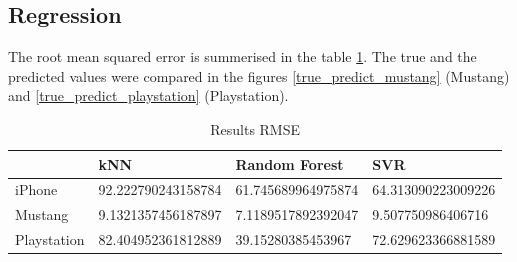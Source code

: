 \subsection{Regression}
The root mean squared error is summerised in the table \ref{tab_rmse_results}. The true and the predicted values were compared in the figures \ref{true_predict_mustang} (Mustang) and \ref{true_predict_playstation} (Playstation). 
\begin{table}[h]
	\begin{center}
	\begin{tabular}{| p{3.25cm} || p{3.25cm} | p{3.25cm} | p{3.25cm} |}
		\hline
		& kNN & Random Forest & SVR \\
		\hline \hline
		iPhone & 92.222790243158784 & 61.745689964975874 & 64.313090223009226 \\
		\hline
		Mustang & 9.1321357456187897 & 7.1189517892392047 & 9.507750986406716 \\
		\hline
		Playstation & 82.404952361812889 & 39.15280385453967 & 72.629623366881589 \\
		\hline
	\end{tabular}
	\end{center}
	\caption{Results RMSE}
	\label{tab_rmse_results}
\end{table}
